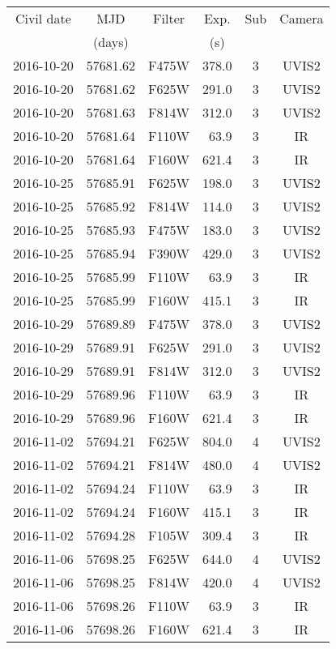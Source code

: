 \begin{tabular}{crcrcc}
\hline\hline
Civil date & \multicolumn{1}{c}{MJD} & Filter & \multicolumn{1}{c}{Exp.} & Sub
& Camera\\
 & \multicolumn{1}{c}{(days)} & & \multicolumn{1}{c}{(s)}\\
\hline
2016-10-20 & 57681.62 & F475W & 378.0 & 3 & UVIS2 \\
2016-10-20 & 57681.62 & F625W & 291.0 & 3 & UVIS2 \\
2016-10-20 & 57681.63 & F814W & 312.0 & 3 & UVIS2 \\
2016-10-20 & 57681.64 & F110W & 63.9 & 3 & IR \\
2016-10-20 & 57681.64 & F160W & 621.4 & 3 & IR \\
2016-10-25 & 57685.91 & F625W & 198.0 & 3 & UVIS2 \\
2016-10-25 & 57685.92 & F814W & 114.0 & 3 & UVIS2 \\
2016-10-25 & 57685.93 & F475W & 183.0 & 3 & UVIS2 \\
2016-10-25 & 57685.94 & F390W & 429.0 & 3 & UVIS2 \\
2016-10-25 & 57685.99 & F110W & 63.9 & 3 & IR \\
2016-10-25 & 57685.99 & F160W & 415.1 & 3 & IR \\
2016-10-29 & 57689.89 & F475W & 378.0 & 3 & UVIS2 \\
2016-10-29 & 57689.91 & F625W & 291.0 & 3 & UVIS2 \\
2016-10-29 & 57689.91 & F814W & 312.0 & 3 & UVIS2 \\
2016-10-29 & 57689.96 & F110W & 63.9 & 3 & IR \\
2016-10-29 & 57689.96 & F160W & 621.4 & 3 & IR \\
2016-11-02 & 57694.21 & F625W & 804.0 & 4 & UVIS2 \\
2016-11-02 & 57694.21 & F814W & 480.0 & 4 & UVIS2 \\
2016-11-02 & 57694.24 & F110W & 63.9 & 3 & IR \\
2016-11-02 & 57694.24 & F160W & 415.1 & 3 & IR \\
2016-11-02 & 57694.28 & F105W & 309.4 & 3 & IR \\
2016-11-06 & 57698.25 & F625W & 644.0 & 4 & UVIS2 \\
2016-11-06 & 57698.25 & F814W & 420.0 & 4 & UVIS2 \\
2016-11-06 & 57698.26 & F110W & 63.9 & 3 & IR \\
2016-11-06 & 57698.26 & F160W & 621.4 & 3 & IR \\

\end{tabular}
